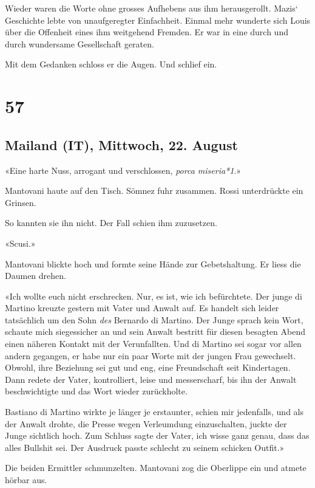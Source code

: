 Wieder waren die Worte ohne grosses Aufhebens aus ihm herausgerollt.
Mazis` Geschichte lebte von unaufgeregter Einfachheit. Einmal mehr
wunderte sich Louis über die Offenheit eines ihm weitgehend Fremden. Er
war in eine durch und durch wundersame Gesellschaft geraten.

Mit dem Gedanken schloss er die Augen. Und schlief ein.

\chapter{57}\label{section-57}

\section{Mailand (IT), Mittwoch, 22.
August}\label{mailand-it-mittwoch-22.-august}

«Eine harte Nuss, arrogant und verschlossen, \emph{porca miseria*1}.»

Mantovani haute auf den Tisch. Sömnez fuhr zusammen. Rossi unterdrückte
ein Grinsen.

So kannten sie ihn nicht. Der Fall schien ihm zuzusetzen.

«Scusi.»

Mantovani blickte hoch und formte seine Hände zur Gebetshaltung. Er
liess die Daumen drehen.

«Ich wollte euch nicht erschrecken. Nur, es ist, wie ich befürchtete.
Der junge di Martino kreuzte gestern mit Vater und Anwalt auf. Es
handelt sich leider tatsächlich um den Sohn \emph{des} Bernardo di
Martino. Der Junge sprach kein Wort, schaute mich siegessicher an und
sein Anwalt bestritt für diesen besagten Abend einen näheren Kontakt mit
der Verunfallten. Und di Martino sei sogar vor allen andern gegangen, er
habe nur ein paar Worte mit der jungen Frau gewechselt. Obwohl, ihre
Beziehung sei gut und eng, eine Freundschaft seit Kindertagen. Dann
redete der Vater, kontrolliert, leise und messerscharf, bis ihn der
Anwalt beschwichtigte und das Wort wieder zurückholte.

Bastiano di Martino wirkte je länger je erstaunter, schien mir
jedenfalls, und als der Anwalt drohte, die Presse wegen Verleumdung
einzuschalten, juckte der Junge sichtlich hoch. Zum Schluss sagte der
Vater, ich wisse ganz genau, dass das alles Bullshit sei. Der Ausdruck
passte schlecht zu seinem schicken Outfit.»

Die beiden Ermittler schmunzelten. Mantovani zog die Oberlippe ein und
atmete hörbar aus.

